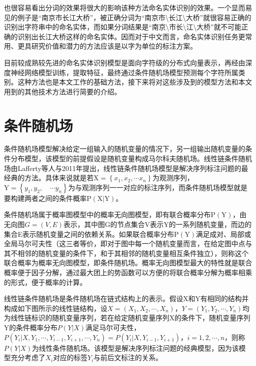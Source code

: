 \documentclass[winfonts,master,oneside,nobackinfo]{njuthesis}
\begin{document}
也很容易看出分词的效果将很大的影响该种方法命名实体识别的效果。一个显而易见的例子是“南京市长江大桥”，被正确分词为“南京市\textbackslash 长江\textbackslash 大桥”就很容易正确的识别出字符串中的命名实体，而如果分词结果是“南京\textbackslash 市长\textbackslash 江\textbackslash 大桥”就不可能正确的识别出长江大桥这样的命名实体。因而对于中文而言，命名实体识别任务更常用、更具研究价值和潜力的方法应该是以字为单位的标注方案。

目前较成熟较先进的命名实体识别模型是面向字符级的分布式向量表示，再经由深度神经网络模型训练，提取特征，最终通过条件随机场模型预测每个字符所属类别。这种方法也是本文工作的基础方法，接下来将对这些涉及到的模型方法和本文用到的其他技术方法进行简要的介绍。

\section{条件随机场}
条件随机场模型解决给定一组输入的随机变量的情况下，另一组输出随机变量的条件分布模型，该模型的前提假设是随机变量构成马尔科夫随机场。线性链条件随机场由Lafferty等人\cite{Lafferty}与2011年提出，线性链条件随机场模型是解决序列标注问题的最经典的方法。具体来说就是若$\mathrm { X } = \left\{ x _ { 1 } , x _ { 2 } , \cdots x _ { n } \right\}$为观测序列，$\mathrm { Y } = \left\{ y _ { 1 } , y _ { 2 } , \quad \cdots y _ { n } \right\}$为与观测序列一一对应的标注序列，而条件随机场模型就是要构建两者之间的条件概率$\mathrm { P } ( \mathrm { X } | \mathrm { Y } )$。

条件随机场属于概率图模型中的概率无向图模型，即有联合概率分布$\mathrm { P } (\mathrm { Y } )$，由无向图$G = ( V , E )$表示，其中图G的节点集合V表示Y的一系列随机变量，而边的集合E表示随机变量之间的依赖关系。如果联合概率分布$\mathrm { P } (\mathrm { Y } )$满足成对、局部或全局马尔可夫性（这三者等价，即对于图中每一个随机变量而言，在给定图中点与其不相邻的随机变量的条件下，和于其相邻的随机变量相互条件独立），则称这个联合概率为概率无向图模型，即条件随机场。概率无向图模型最大的特性就是联合概率便于因子分解，通过最大团上的势函数可以方便的将联合概率分解为概率相乘的形式，便于概率的计算。

线性链条件随机场是条件随机场在链式结构上的表示。假设X和Y有相同的结构并构成如下图所示的线性链结构，设$X = \left( X _ { 1 } , X _ { 2 } , \cdots , X _ { n } \right)$，$Y = \left( Y _ { 1 } , Y _ { 2 } , \cdots , Y _ { n } \right)$均为线性链标识的随机变量序列，若在给定随机变量序列X的条件下，随机变量序列Y的条件概率分布$P ( Y | X )$满足马尔可夫性，$P \left( Y _ { i } | X , Y _ { 1 } , \cdots , Y _ { i - 1 } , Y _ { i + 1 } , \cdots , Y _ { n } \right) = P \left( Y _ { i } | X , Y _ { i - 1 } , Y _ { i + 1 } \right)$，$i = 1,2 , \cdots , n$，则称$P ( Y | X )$为线性条件随机场。该模型是解决序列标注问题的经典模型，因为该模型充分考虑了$X _ { i }$对应的标签$Y _ { i }$与前后文标注的关系。
\end{document}
